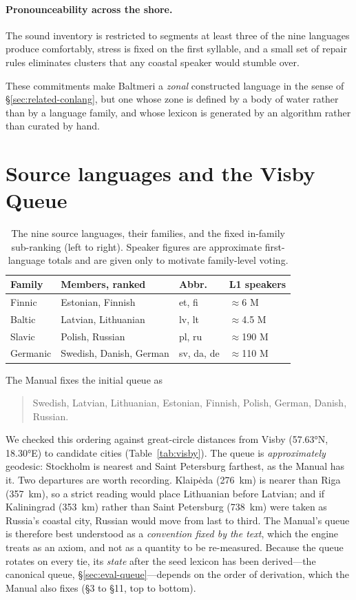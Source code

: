 \paragraph{Pronounceability across the shore.} The sound inventory is restricted to segments at least three of the nine languages produce comfortably, stress is fixed on the first syllable, and a small set of repair rules eliminates clusters that any coastal speaker would stumble over.

These commitments make Baltmeri a \emph{zonal} constructed language in the sense of \S\ref{sec:related-conlang}, but one whose zone is defined by a body of water rather than by a language family, and whose lexicon is generated by an algorithm rather than curated by hand.

\section{Source languages and the Visby Queue}\label{sec:sources}

\begin{table}[t]
\centering\small
\caption{The nine source languages, their families, and the fixed in-family sub-ranking (left to right). Speaker figures are approximate first-language totals and are given only to motivate family-level voting.}
\label{tab:sources}
\setlength{\tabcolsep}{4pt}
\begin{tabular}{@{}lp{3.1cm}ll@{}}
\toprule
Family & Members, ranked & Abbr. & L1 speakers \\
\midrule
Finnic & Estonian, Finnish & et, fi & $\approx$6 M \\
Baltic & Latvian, Lithuanian & lv, lt & $\approx$4.5 M \\
Slavic & Polish, Russian & pl, ru & $\approx$190 M \\
Germanic & Swedish, Danish, German & sv, da, de & $\approx$110 M \\
\bottomrule
\end{tabular}
\end{table}

The Manual fixes the initial queue as
\begin{quote}
Swedish, Latvian, Lithuanian, Estonian, Finnish, Polish, German, Danish, Russian.
\end{quote}
We checked this ordering against great-circle distances from Visby (57.63°N, 18.30°E) to candidate cities (Table~\ref{tab:visby}). The queue is \emph{approximately} geodesic: Stockholm is nearest and Saint Petersburg farthest, as the Manual has it. Two departures are worth recording. Klaipėda (276~km) is nearer than Riga (357~km), so a strict reading would place Lithuanian before Latvian; and if Kaliningrad (353~km) rather than Saint Petersburg (738~km) were taken as Russia's coastal city, Russian would move from last to third. The Manual's queue is therefore best understood as a \emph{convention fixed by the text}, which the engine treats as an axiom, and not as a quantity to be re-measured. Because the queue rotates on every tie, its \emph{state} after the seed lexicon has been derived---the canonical queue, \S\ref{sec:eval-queue}---depends on the order of derivation, which the Manual also fixes (\S3 to \S11, top to bottom).

